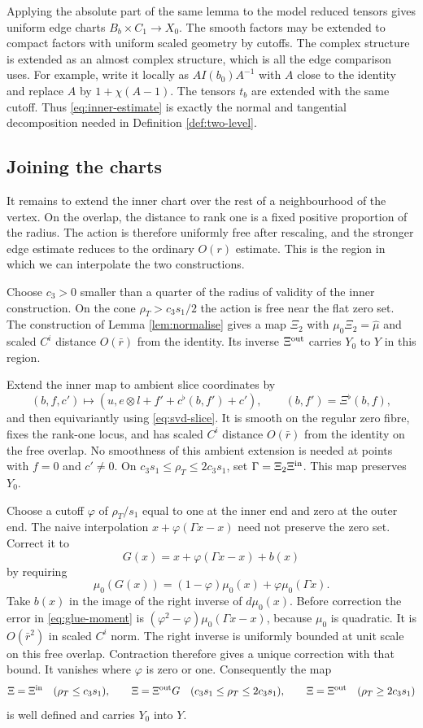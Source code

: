 Applying the absolute part of the same lemma to the model
reduced tensors gives uniform edge charts
$B_b\times C_1\to X_0$. The smooth factors may be extended
to compact factors with uniform scaled geometry by cutoffs.
The complex structure is extended as an almost complex structure,
which is all the edge comparison uses. For example, write it
locally as $A I(b_0)A^{-1}$ with $A$ close to the identity and
replace $A$ by $1+\chi(A-1)$. The tensors $t_b$ are extended
with the same cutoff. Thus \eqref{eq:inner-estimate} is exactly
the normal and tangential decomposition needed in
Definition \ref{def:two-level}.

\subsection{Joining the charts}
It remains to extend the inner chart over the rest of a
neighbourhood of the vertex. On the overlap, the distance to rank
one is a fixed positive proportion of the radius. The action is
therefore uniformly free after rescaling, and the stronger edge
estimate reduces to the ordinary $O(r)$ estimate. This is the
region in which we can interpolate the two constructions.

Choose $c_3>0$ smaller than a quarter of the radius of validity
of the inner construction. On the cone $\rho_T>c_3s_1/2$
the action is free near the flat zero set. The construction of
Lemma \ref{lem:normalise} gives a map $\Xi_2$ with
$\mu_0\Xi_2=\widehat\mu$ and scaled $C^i$ distance
$O(\bar r)$ from the identity. Its inverse $\Xi^{\rm out}$
carries $Y_0$ to $Y$ in this region.

Extend the inner map to ambient slice coordinates by
\[
 (b,f,c')\longmapsto
 (u,e\otimes l+f'+c^\flat(b,f')+c'),
 \qquad (b,f')=\Xi^\flat(b,f),
\]
and then equivariantly using \eqref{eq:svd-slice}. It is
smooth on the regular zero fibre, fixes the rank-one locus, and
has scaled $C^i$ distance $O(\bar r)$ from the identity on the
free overlap. No smoothness of this ambient extension is needed
at points with $f=0$ and $c'\ne0$.
On $c_3s_1\le\rho_T\le2c_3s_1$, set
$\Gamma=\Xi_2\Xi^{\rm in}$. This map preserves $Y_0$.

Choose a cutoff $\varphi$ of $\rho_T/s_1$ equal to one at
the inner end and zero at the outer end. The naive interpolation
$x+\varphi(\Gamma x-x)$ need not preserve the zero set.
Correct it to
\[
 G(x)=x+\varphi(\Gamma x-x)+b(x)
\]
by requiring
\begin{equation}\label{eq:glue-moment}
 \mu_0(G(x))=(1-\varphi)\mu_0(x)+\varphi\mu_0(\Gamma x).
\end{equation}
Take $b(x)$ in the image of the right inverse of $d\mu_0(x)$.
Before correction the error in \eqref{eq:glue-moment} is
$(\varphi^2-\varphi)\mu_0(\Gamma x-x)$, because $\mu_0$
is quadratic. It is $O(\bar r^2)$ in scaled $C^i$ norm.
The right inverse is uniformly bounded at unit scale on this
free overlap. Contraction therefore gives a unique correction
with that bound. It vanishes where $\varphi$ is zero or one.
Consequently the map
\[
 \Xi=\Xi^{\rm in}\quad(\rho_T\le c_3s_1),\qquad
 \Xi=\Xi^{\rm out}G\quad(c_3s_1\le\rho_T\le2c_3s_1),\qquad
 \Xi=\Xi^{\rm out}\quad(\rho_T\ge2c_3s_1)
\]
is well defined and carries $Y_0$ into $Y$.

